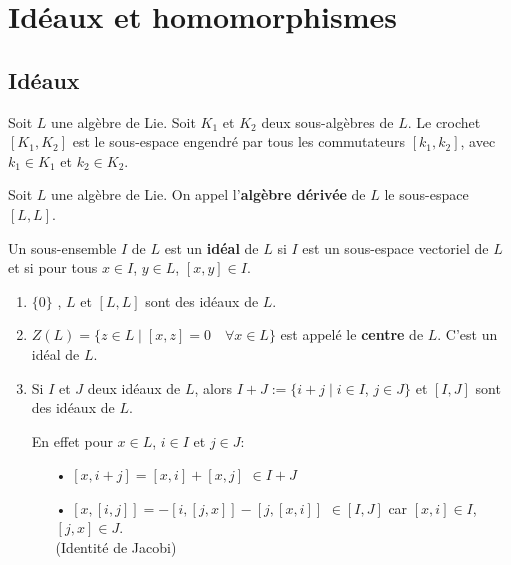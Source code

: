 \documentclass[a4paper,openany,12pt]{report}
\theoremstyle{break}
{\theorembodyfont{\upshape}
\newtheorem*{rmq}{Remarque :}
\newtheorem*{prv}{Preuve :}
\newtheorem*{ex}{Exemples :}
\newtheorem*{exe}{Exemple : }
\newtheorem*{nota}{Notation :}
\newtheorem*{dem}{D\'emonstration :}}
\begin{document}
\section{Idéaux et homomorphismes}

\subsection{Idéaux}

\begin{df}
\quad Soit $L$ une algèbre de Lie. Soit $K_1$ et $K_2$ deux sous-algèbres de $L$. Le crochet $[K_1,K_2]$ est le sous-espace engendré par tous les commutateurs $[k_1,k_2]$, avec $k_1 \in K_1$ et $k_2 \in K_2$.
\end{df}

\begin{df}
\quad Soit $L$ une algèbre de Lie. On appel l'\textbf{algèbre dérivée} de $L$ le sous-espace $[L,L]$.
\end{df}

\begin{df}
\quad Un sous-ensemble $I$ de $L$ est un \textbf{idéal} de $L$ si $I$ est un sous-espace vectoriel de $L$ et si pour tous $x \in I$, $y \in L$, $[x, y] \in I$.
\end{df}

\begin{ex}
\begin{enumerate}
\item $\{0 \}$ , $L$ et $[L,L]$ sont des idéaux de $L$.

\item $Z(L) = \{ z \in L  \mid [x,z]=0 \quad \forall x \in L\}$ est appelé le \textbf{centre} de $L$. C'est un idéal de $L$.

\item Si $I$ et $J$ deux idéaux de $L$, alors $I+J:=\{i+j \mid i \in I$, $j \in J\}$ et $[I,J]$ sont des idéaux de $L$.

En effet pour $x \in L$, $i \in I$ et $j \in J$:
\begin{itemize}
\item[•] $[x,i+j]=[x,i]+[x,j]$ $\in I+J$
\item[•]$[x,[i,j]]=-[i,[j,x]]-[j,[x,i]]$ $\in [I,J]$ car $[x,i] \in I$, $[j,x] \in J$.\\ (Identité de Jacobi)
\end{itemize}
\end{enumerate}
\end{ex}
\end{document}
